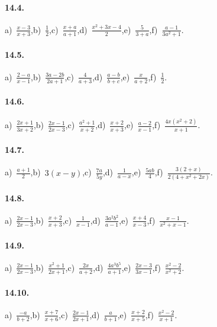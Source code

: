 \paragraph{14.4.}
a)~$\frac{x-3}{x+3}$,\quad b)~$\frac{1}{2}$,\quad c)~$\frac{x+a}{a+1}$,\quad d)~$\frac{x^{2}+3x-4}{2}$,\quad e)~$\frac{5}{3+a}$,\quad f)~$\frac{a-1}{3a^{2}+1}$.

\paragraph{14.5.}
a)~$\frac{2-a}{x-1}$,\quad b)~$\frac{3a-2b}{2a+1}$,\quad c)~$\frac{4}{a+3}$,\quad d)~$\frac{a-b}{b+c}$,\quad e)~$\frac{x}{a+2}$,\quad f)~$\frac{1}{2}$.

\paragraph{14.6.}
a)~$\frac{2x+1}{3x+2}$,\quad b)~$\frac{2x-1}{2x-3}$,\quad c)~$\frac{a^2+1}{x+2}$,\quad d)~$\frac{x+2}{x+3}$,\quad e)~$\frac{a-2}{x-1}$,\quad f)~$\frac{4x\left(x^2+2\right)}{x+1}$.

\paragraph{14.7.}
a)~$\frac{a+1}{2}$,\quad b)~$3(x-y)$,\quad c)~$\frac{7a}{5y}$,\quad d)~$\frac{1}{a-x}$,\quad e)~$\frac{5ab}{4}$,\quad f)~$\frac{3(2+x)}{2\left(4+x^{2}+2x\right)}$.

\paragraph{14.8.}
a)~$\frac{2x-1}{2x-3}$,\quad b)~$\frac{x+2}{x+3}$,\quad c)~$\frac{1}{x-1}$,\quad d)~$\frac{3a^{2}b^{2}}{a-1}$,\quad e)~$\frac{x+4}{x-3}$,\quad f)~$\frac{x-1}{x^2+x-1}$.

\paragraph{14.9.}
a)~$\frac{2x-1}{2x-3}$,\quad b)~$\frac{x^2+1}{2x+1}$,\quad c)~$\frac{2x}{a+2}$,\quad d)~$\frac{4a^{3}b^{5}}{a+1}$,\quad e)~$\frac{2x-3}{3x-1}$,\quad f)~$\frac{x^2-2}{x^2+2}$.

\paragraph{14.10.}
a)~$\frac{-a}{b+2}$,\quad b)~$\frac{x+7}{x+6}$,\quad c)~$\frac{2x-1}{2x+1}$,\quad d)~$\frac{a}{b+1}$,\quad e)~$\frac{x+2}{x+5}$,\quad f)~$\frac{x^{2}-2}{x+1}$.

